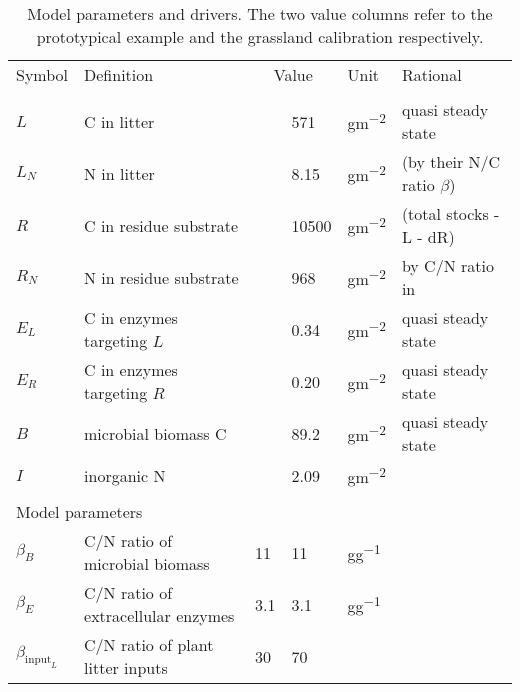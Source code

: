 % 

\begin{table}[t]
\caption{
\label{tab:modelParameters}
Model parameters and drivers. The two value columns refer to the prototypical
example and the grassland calibration respectively. }
\vskip4mm
\centering
\begin{tabular}{lp{6cm}lllp{5.5cm}}
\tophline
Symbol &  Definition & \multicolumn{2}{c}{Value} & Unit & Rational \\
\middlehline
\multicolumn{6}{l}{State variables}  \\
$L$ &  C in litter & & 571 & \unit{gm^{-2}} & quasi steady state 
\\
$L_N$ &  N in litter & & 8.15 & \unit{gm^{-2}} & \citep{Perveen14}
(by their N/C ratio $\beta$)
\\
$R$ &  C in residue substrate & & 10500 & \unit{gm^{-2}} &
\citep{Allard07} (total stocks - L - dR)
\\
$R_N$ &  N in residue substrate & & 968 & \unit{gm^{-2}} & by C/N
ratio in \citep{Perveen14} \\
$E_L$ &  C in enzymes targeting $L$ & & 0.34 & \unit{gm^{-2}} & 
quasi steady state \\
$E_R$ &  C in enzymes targeting $R$ & & 0.20 & \unit{gm^{-2}} & 
quasi steady state \\
$B$ & microbial biomass C & & 89.2 & \unit{gm^{-2}} &  quasi steady
state \\
$I$ & inorganic N & & 2.09 & \unit{gm^{-2}} & \citep{Perveen14} \\
\\
\multicolumn{6}{l}{Model parameters}  \\
$\beta_B$ &  C/N ratio of microbial biomass & 11 & 11& \unit{gg^{-1}} &
\citep{Perveen14} 
\\
$\beta_E$ &  C/N ratio of extracellular enzymes & 3.1 & 3.1 &
\unit{gg^{-1}} & \citep{Sterner02} \\
$\beta_{\mathrm{input}_L}$ &  C/N ratio of plant litter inputs & 30 & 70 &

\end{tabular}
\end{table}
